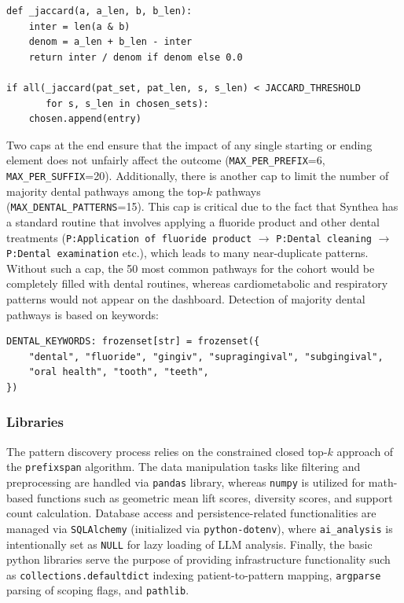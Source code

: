 \begin{lstlisting}[style=pythonstyle]
def _jaccard(a, a_len, b, b_len):
    inter = len(a & b)
    denom = a_len + b_len - inter
    return inter / denom if denom else 0.0

if all(_jaccard(pat_set, pat_len, s, s_len) < JACCARD_THRESHOLD
       for s, s_len in chosen_sets):
    chosen.append(entry)

\end{lstlisting}

Two caps at the end ensure that the impact of any single starting or ending element does not unfairly affect the outcome (\texttt{MAX\_PER\_PREFIX}=6, \texttt{MAX\_PER\_SUFFIX}=20). Additionally, there is another cap to limit the number of majority dental pathways among the top-\(k\) pathways (\texttt{MAX\_DENTAL\_PATTERNS}=15). This cap is critical due to the fact that Synthea has a standard routine that involves applying a fluoride product and other dental treatments (\texttt{P:Application of fluoride product} \(\rightarrow\) \texttt{P:Dental cleaning} \(\rightarrow\) \texttt{P:Dental examination} etc.), which leads to many near-duplicate patterns. Without such a cap, the 50 most common pathways for the cohort would be completely filled with dental routines, whereas cardiometabolic and respiratory patterns would not appear on the dashboard. Detection of majority dental pathways is based on keywords:

\begin{lstlisting}[style=pythonstyle]
DENTAL_KEYWORDS: frozenset[str] = frozenset({
    "dental", "fluoride", "gingiv", "supragingival", "subgingival",
    "oral health", "tooth", "teeth",
})

\end{lstlisting}

\subsubsection*{Libraries}

The pattern discovery process relies on the constrained closed top-\(k\) approach of the \texttt{prefixspan} algorithm. The data manipulation tasks like filtering and preprocessing are handled via \texttt{pandas} library, whereas \texttt{numpy} is utilized for math-based functions such as geometric mean lift scores, diversity scores, and support count calculation. Database access and persistence-related functionalities are managed via \texttt{SQLAlchemy} (initialized via \texttt{python-dotenv}), where \texttt{ai\_analysis} is intentionally set as \texttt{NULL} for lazy loading of LLM analysis. Finally, the basic python libraries serve the purpose of providing infrastructure functionality such as \texttt{collections.defaultdict} indexing patient-to-pattern mapping, \texttt{argparse} parsing of scoping flags, and \texttt{pathlib}.

